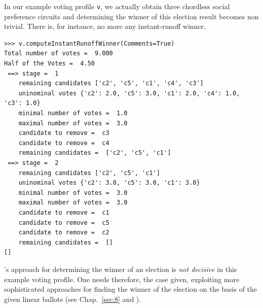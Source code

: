 In our example voting profile \texttt{v}, we actually obtain three chordless social preference circuits and determining the winner of this election result becomes non trivial. There is, for instance, no more any instant-runoff winner.
\begin{lstlisting}
>>> v.computeInstantRunoffWinner(Comments=True)
Total number of votes =  9.000
Half of the Votes =  4.50
 ==> stage =  1
    remaining candidates ['c2', 'c5', 'c1', 'c4', 'c3']
    uninominal votes {'c2': 2.0, 'c5': 3.0, 'c1': 2.0, 'c4': 1.0, 'c3': 1.0}
    minimal number of votes =  1.0
    maximal number of votes =  3.0
    candidate to remove =  c3
    candidate to remove =  c4
    remaining candidates =  ['c2', 'c5', 'c1']
 ==> stage =  2
    remaining candidates ['c2', 'c5', 'c1']
    uninominal votes {'c2': 3.0, 'c5': 3.0, 'c1': 3.0}
    minimal number of votes =  3.0
    maximal number of votes =  3.0
    candidate to remove =  c1
    candidate to remove =  c5
    candidate to remove =  c2
    remaining candidates =  []
[]
\end{lstlisting}

\Condorcet 's approach for determining the winner of an election is \emph{not decisive} in this example voting profile. One needs therefore, the case given, exploiting more sophisticated approaches for finding the winner of the election on the basis of the given linear ballots (see Chap.~\ref{sec:8} and \citealp{BIS-2008a}). 

